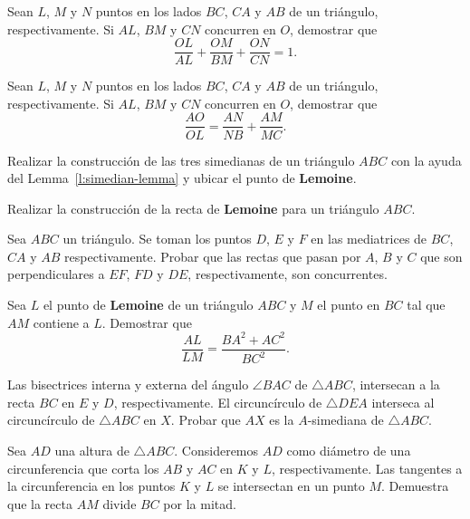 \begin{section-exercise}
    Sean $L$, $M$ y $N$ puntos en los lados $BC$, $CA$ y $AB$ de un triángulo, respectivamente.
    Si $AL$, $BM$ y $CN$ concurren en $O$, demostrar que
    \[\frac{OL}{AL} + \frac{OM}{BM} + \frac{ON}{CN} = 1.\]
\end{section-exercise}

\begin{section-exercise}
    Sean $L$, $M$ y $N$ puntos en los lados $BC$, $CA$ y $AB$ de un triángulo, respectivamente.
    Si $AL$, $BM$ y $CN$ concurren en $O$, demostrar que
    \[\frac{AO}{OL} = \frac{AN}{NB} + \frac{AM}{MC}.\]
\end{section-exercise}


\begin{section-exercise}
    Realizar la construcción de las tres simedianas de un triángulo $ABC$ con la ayuda del Lemma~\ref{l:simedian-lemma} y ubicar el punto de \textbf{Lemoine}.
\end{section-exercise}

\begin{section-exercise}
    Realizar la construcción de la recta de \textbf{Lemoine} para un triángulo $ABC$.
\end{section-exercise}


\begin{section-problem}
    Sea $ABC$ un triángulo.
    Se toman los puntos $D$, $E$ y $F$ en las mediatrices de $BC$, $CA$ y $AB$ respectivamente.
    Probar que las rectas que pasan por $A$, $B$ y $C$ que son perpendiculares a $EF$, $FD$ y $DE$, respectivamente, son concurrentes.
\end{section-problem}

\begin{section-problem}
    Sea $L$ el punto de \textbf{Lemoine} de un triángulo $ABC$ y $M$ el punto en $BC$ tal que $AM$ contiene a $L$.
    Demostrar que
    \[
        \frac{AL}{LM} = \frac{BA^2 + AC^2}{BC^2}.
    \]
\end{section-problem}

\begin{section-problem}
    Las bisectrices interna y externa del ángulo $\angle BAC$ de $\triangle ABC$, intersecan a la recta $BC$ en $E$ y $D$, respectivamente.
    El circuncírculo de $\triangle DEA$ interseca al circuncírculo de $\triangle ABC$ en $X$.
    Probar que $AX$ es la $A$-simediana de $\triangle ABC$.
\end{section-problem}

\begin{section-problem}
    Sea $AD$ una altura de $\triangle ABC$.
    Consideremos $AD$ como diámetro de una circunferencia que corta los $AB$ y $AC$ en $K$ y $L$, respectivamente.
    Las tangentes a la circunferencia en los puntos $K$ y $L$ se intersectan en un punto $M$.
    Demuestra que la recta $AM$ divide $BC$ por la mitad.
\end{section-problem}

